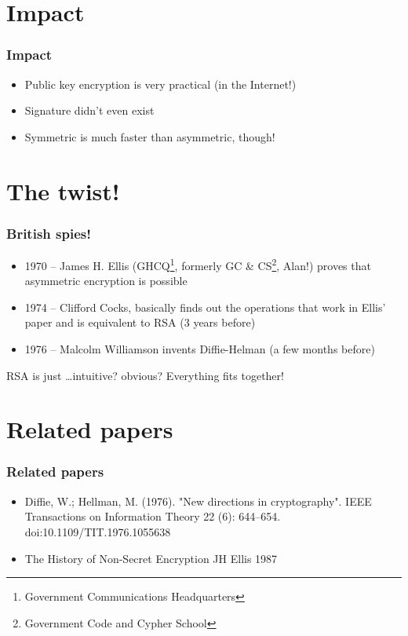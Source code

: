 \documentclass{beamer}
\begin{document}
\section{Impact}

\begin{frame}
	\frametitle{Impact}

	\begin{itemize}
		\item Public key encryption is very practical (in the
		      Internet!)
		\item Signature didn't even exist
		\item Symmetric is much faster than asymmetric, though!
	\end{itemize}
\end{frame}

\section{The twist!}

\begin{frame}
	\frametitle{British spies!}

	\begin{itemize}
		\item 1970 -- James H. Ellis (GHCQ\footnote{Government
		      Communications Headquarters}, formerly GC \&
		      CS\footnote{Government Code and Cypher School}, Alan!)
		      proves that asymmetric encryption is possible
		\item 1974 -- Clifford Cocks, basically finds out the
		      operations that work in Ellis' paper and is equivalent
		      to RSA (3 years before)
		\item 1976 -- Malcolm Williamson invents Diffie-Helman (a
		      few months before)
	\end{itemize}

	RSA is just \ldots intuitive? obvious? Everything fits together!
\end{frame}

\section{Related papers}

\begin{frame}
	\frametitle{Related papers}

	\begin{itemize}
		\item Diffie, W.; Hellman, M. (1976). "New directions in
		      cryptography". IEEE Transactions on Information Theory 22 
		      (6): 644–654. doi:10.1109/TIT.1976.1055638
		\item The History of Non-Secret Encryption JH Ellis 1987
	\end{itemize}
\end{frame}
\end{document}
